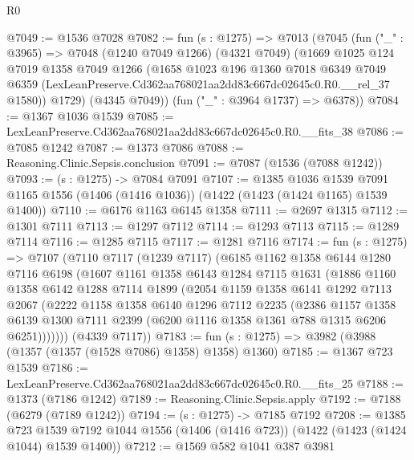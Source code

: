 \begin{lexlean}{R0}
\begin{coremodule}
@7049 := @1536 @7028
@7082 := fun (s : @1275) =>
  @7013
    (@7045
      (fun ("_" : @3965) =>
      @7048
        (@1240 @7049 @1266)
        (@4321 @7049)
        (@1669
          @1025
          @124
          @7019
          @1358
          @7049
          @1266
          (@1658
            @1023
            @196
            @1360
            @7018
            @6349
            @7049
            @6359
            (LexLeanPreserve.Cd362aa768021aa2dd83c667dc02645c0.R0.__rel_37 @1580))
          @1729)
        (@4345 @7049))
      (fun ("_" : @3964 @1737) => @6378))
@7084 := @1367 @1036 @1539
@7085 := LexLeanPreserve.Cd362aa768021aa2dd83c667dc02645c0.R0.__fits_38
@7086 := @7085 @1242
@7087 := @1373 @7086
@7088 := Reasoning.Clinic.Sepsis.conclusion
@7091 := @7087 (@1536 (@7088 @1242))
@7093 := (s : @1275) -> @7084 @7091
@7107 := @1385
    @1036
    @1539
    @7091
    @1165
    @1556
    (@1406 (@1416 @1036))
    (@1422 (@1423 (@1424 @1165) @1539 @1400))
@7110 := @6176 @1163 @6145 @1358
@7111 := @2697 @1315
@7112 := @1301 @7111
@7113 := @1297 @7112
@7114 := @1293 @7113
@7115 := @1289 @7114
@7116 := @1285 @7115
@7117 := @1281 @7116
@7174 := fun (s : @1275) =>
  @7107
    (@7110
      @7117
      (@1239 @7117)
      (@6185
        @1162
        @1358
        @6144
        @1280
        @7116
        @6198
        (@1607
          @1161
          @1358
          @6143
          @1284
          @7115
          @1631
          (@1886
            @1160
            @1358
            @6142
            @1288
            @7114
            @1899
            (@2054
              @1159
              @1358
              @6141
              @1292
              @7113
              @2067
              (@2222
                @1158
                @1358
                @6140
                @1296
                @7112
                @2235
                (@2386
                  @1157
                  @1358
                  @6139
                  @1300
                  @7111
                  @2399
                  (@6200 @1116 @1358 @1361 @788 @1315 @6206 @6251)))))))
      (@4339 @7117))
@7183 := fun (s : @1275) => @3982 (@3988 (@1357 (@1357 (@1528 @7086) @1358) @1358) @1360)
@7185 := @1367 @723 @1539
@7186 := LexLeanPreserve.Cd362aa768021aa2dd83c667dc02645c0.R0.__fits_25
@7188 := @1373 (@7186 @1242)
@7189 := Reasoning.Clinic.Sepsis.apply
@7192 := @7188 (@6279 (@7189 @1242))
@7194 := (s : @1275) -> @7185 @7192
@7208 := @1385
    @723
    @1539
    @7192
    @1044
    @1556
    (@1406 (@1416 @723))
    (@1422 (@1423 (@1424 @1044) @1539 @1400))
@7212 := @1569 @582 @1041 @387 @3981

\end{coremodule}
\end{lexlean}
